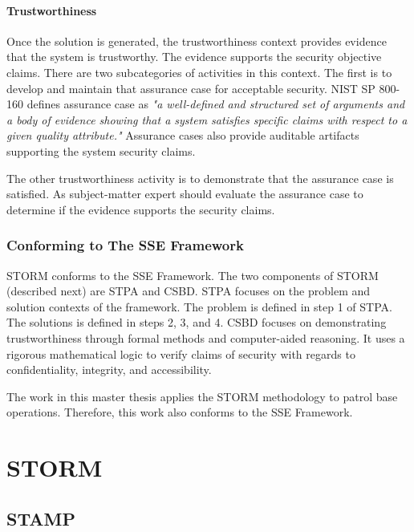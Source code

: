 \documentclass[../../main/main.tex]{subfiles}
\begin{document}
\paragraph*{Trustworthiness}
Once the solution is generated, the trustworthiness context provides evidence that the system is trustworthy.  The evidence supports the security objective claims.  There are two subcategories of activities in this context.  The first is to develop and maintain that assurance case for acceptable security.  NIST SP 800-160 defines assurance case as \textit{"a well-defined and structured set of arguments and a body of evidence showing that a system satisfies specific claims with respect to a given quality attribute."}  Assurance cases also provide auditable artifacts supporting the system security claims.

The other trustworthiness activity is to demonstrate that the assurance case is satisfied.  As subject-matter expert should evaluate the assurance case to determine if the evidence supports the security claims.

\subsubsection{Conforming to The SSE Framework}
STORM conforms to the SSE Framework.  The two components of STORM (described next) are STPA and CSBD.  STPA focuses on the problem and solution contexts of the framework.  The problem is defined in step 1 of STPA.  The solutions is defined in steps 2, 3, and 4. CSBD focuses on demonstrating trustworthiness through formal methods and computer-aided reasoning.  It uses a rigorous mathematical logic to verify claims of security with regards to confidentiality, integrity, and accessibility.  

The work in this master thesis applies the STORM methodology to patrol base operations.  Therefore, this work also conforms to the SSE Framework.


\section{STORM}\label{sec:storm}

\subsection{STAMP}\label{ssec:stamp}
\end{document}
